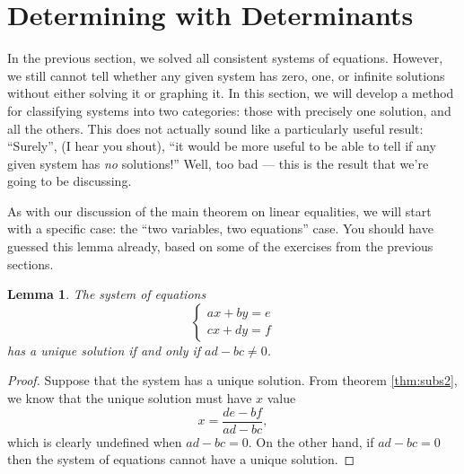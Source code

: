 \documentclass[a4paper,leqno]{article}
\numberwithin{equation}{section}
\newtheorem{lem}[equation]{Lemma}
\theoremstyle{definition}
\theoremstyle{remark}
\begin{document}
\section{Determining with Determinants}
In the previous section, we solved all consistent systems of equations. However, we still cannot tell whether any given system has zero, one, or
infinite solutions without either solving it or graphing it. In this section, we will develop a method for classifying systems into two categories:
those with precisely one solution, and all the others. This does not actually sound like a particularly useful result: ``Surely'', (I hear you shout),
``it would be more useful to be able to tell if any given system has \emph{no} solutions!'' Well, too bad --- this is the result that we're going to
be discussing.

As with our discussion of the main theorem on linear equalities, we will start with a specific case: the ``two variables, two equations'' case. You should
have guessed this lemma already, based on some of the exercises from the previous sections.
\begin{lem}\label{lem:det2}
  The system of equations
  \begin{equation*}
    \begin{cases}
      ax + by = e\\
      cx + dy = f
    \end{cases}
  \end{equation*}
  has a unique solution if and only if $ ad - bc \neq 0 $.
\end{lem}
\begin{proof}
  Suppose that the system has a unique solution. From theorem \ref{thm:subs2}, we know that the unique solution must have $ x $ value
  \begin{displaymath}
    x = \frac{de - bf}{ad - bc},
  \end{displaymath}
  which is clearly undefined when $ ad - bc = 0 $. On the other hand, if $ ad - bc = 0 $ then the system of equations cannot have
  a unique solution.
\end{proof}
\end{document}
